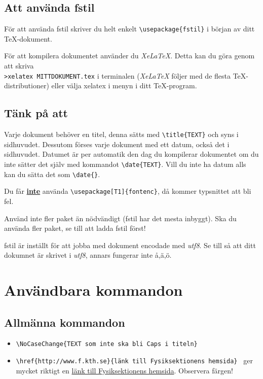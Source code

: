 \documentclass[a4paper]{article}
\newcommand{\bs}{\textbackslash}
\begin{document}
\subsection{Att använda fstil}
För att använda fstil skriver du helt enkelt \texttt{\bs usepackage\{fstil\}} i början av ditt \TeX-dokument.

För att kompilera dokumentet använder du \textit{XeLaTeX}. Detta kan du göra genom att skriva \\ \texttt{>xelatex MITTDOKUMENT.tex} i terminalen (\textit{XeLaTeX} följer med de flesta \TeX-distributioner) eller välja xelatex i menyn i ditt \TeX-program.

\subsection{Tänk på att}
Varje dokument behöver en titel, denna sätts med \texttt{\bs title\{TEXT\}} och syns i sidhuvudet. Dessutom förses varje dokument med ett datum, också det i sidhuvudet. Datumet är per automatik den dag du kompilerar dokumentet om du inte sätter det själv med kommandot \texttt{\bs date\{TEXT\}}. Vill du inte ha datum alls kan du sätta det som \texttt{\bs date\{\}}.

Du får \textbf{\underline{inte}} använda \texttt{\bs usepackage[T1]\{fontenc\}}, då kommer typsnittet att bli fel.

Använd inte fler paket än nödvändigt (fstil har det mesta inbyggt). Ska du använda fler paket, se till att ladda fstil först!

fstil är inställt för att jobba med dokument encodade med \textit{utf8}. Se till så att ditt dokumnet är skrivet i \textit{utf8}, annars fungerar inte å,ä,ö.

\section{Användbara kommandon}

\subsection{Allmänna kommandon}
\begin{itemize}
\item \texttt{\bs NoCaseChange\{TEXT som inte ska bli Caps i titeln\} }
\item \texttt{\bs href\{http://www.f.kth.se\}\{länk till Fysiksektionens hemsida\} } ger mycket riktigt en  \href{http://www.f.kth.se}{länk till Fysiksektionens hemsida}. Observera färgen!
\end{itemize}
\end{document}

